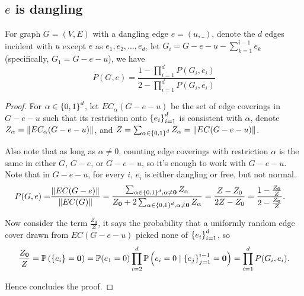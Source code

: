 \subsection{$e$ is dangling}
\begin{Prop}
For graph $G=(V,E)$ with a dangling edge $e=(u,\_)$, denote the $d$
edges incident with $u$ except $e$ as $e_1, e_2, \ldots, e_d$,
let $G_i = G - e - u - \sum_{k=1}^{i-1} e_k$ (specifically, $G_1 = G - e - u$), we have%
	\begin{equation}
		P(G, e) = \frac{1-\prod_{i=1}^d P(G_i, e_i)}{2 - \prod_{i=1}^d P(G_i, e_i)} %
		\label{propp3rg}
	\end{equation}
\end{Prop}
\begin{proof}
	For $\alpha \in \left\{0,1\right\}^d$, let $EC_{\alpha}(G-e-u)$ be the set of edge coverings in $G-e-u$ such that its restriction onto $\left\{e_i\right\}_{i=1}^{d}$ is consistent with $\alpha$, denote $Z_{\alpha} = \left\Vert EC_{\alpha}(G-e-u)\right\Vert$, and $Z = \sum_{\alpha \in \left\{0,1\right\}^d} Z_{\alpha} = \left\Vert EC(G-e-u)\right\Vert$. %

		Also note that as long as $\alpha \neq 0$, counting edge coverings with restriction $\alpha$ is the same in either $G$, $G-e$, or $G-e-u$, so it's enough to work with $G-e-u$. Note that in $G-e-u$, for every $i$, $e_i$ is either dangling or free, but not normal.
	\begin{align*}
		P(G,e) = & \frac{\left\Vert EC(G-e)\right\Vert}{\left\Vert EC(G)\right\Vert} 
		= \frac{\sum_{\alpha \in \left\{0,1\right\}^d, \alpha \neq \mathbf{0}} Z_{\alpha} }{ Z_{\mathbf{0}} + 2 \sum_{\alpha \in \left\{0,1\right\}^d, \alpha \neq \mathbf{0}} Z_{\alpha}} 
		=\frac{Z - Z_0}{2 Z - Z_0}
		= \frac{1 - \frac{Z_{\mathbf{0}}}{Z}}{ 2 - \frac{Z_{\mathbf{0}}}{Z}}.
	\end{align*}

	Now consider the term $\frac{Z_{\mathbf{0}}}{Z}$, it says the probability that a uniformly random edge cover drawn from $EC(G-e-u)$ picked none of $\left\{e_i\right\}_{i=1}^{d}$, so
	\begin{align*}
		\frac{Z_{\mathbf{0}}}{Z}=\mathbb{P} \left( \left\{e_i\right\} = \mathbf{0}\right) = \mathbb{P} (e_1 = 0) \prod_{i=2}^d \mathbb{P} \left(e_i = 0 \mid \left\{e_j\right\}_{j=1}^{i-1} = \mathbf{0}\right) = \prod_{i=1}^d P(G_i, e_i).
	\end{align*}

	Hence concludes the proof.
	
\end{proof}

